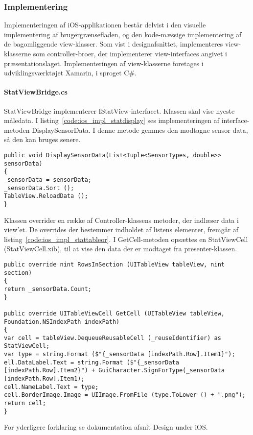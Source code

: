 \subsubsection{Implementering}
Implementeringen af iOS-applikationen består delvist i den visuelle implementering af brugergrænsefladen, og den kode-mæssige implementering af de bagomliggende view-klasser. Som vist i designafsnittet, implementeres view-klasserne som controller-broer, der implementerer view-interfaces angivet i præsentationslaget. Implementeringen af view-klasserne foretages i udviklingsværktøjet Xamarin, i sproget C\#. 

\paragraph{StatViewBridge.cs}
StatViewBridge implementerer IStatView-interfacet. Klassen skal vise nyeste måledata. I listing~\ref{code:ios_impl_statdisplay} ses implementeringen af interface-metoden DisplaySensorData. I denne metode gemmes den modtagne sensor data, så den kan bruges senere.

\begin{lstlisting}[caption={DisplaySensorData(...)},label={code:ios_impl_statdisplay}]
public void DisplaySensorData(List<Tuple<SensorTypes, double>> sensorData)
{
_sensorData = sensorData;
_sensorData.Sort ();
TableView.ReloadData ();
}
\end{lstlisting}

Klassen overrider en række af Controller-klassens metoder, der indlæser data i view'et. De overrides der bestemmer indholdet af listens elementer, fremgår af listing~\ref{code:ios_impl_stattableor}. I GetCell-metoden opsættes en StatViewCell (StatViewCell.xib), til at vise den data der er modtaget fra presenter-klassen.

\begin{lstlisting}[caption={Overrides af UITableViewController-metoder i StatViewBridge},label={code:ios_impl_stattableor}]
public override nint RowsInSection (UITableView tableView, nint section)
{
return _sensorData.Count;
}

public override UITableViewCell GetCell (UITableView tableView, Foundation.NSIndexPath indexPath)
{	
var cell = tableView.DequeueReusableCell (_reuseIdentifier) as StatViewCell;
var type = string.Format ($"{_sensorData [indexPath.Row].Item1}");
ell.DataLabel.Text = string.Format ($"{_sensorData [indexPath.Row].Item2}") + GuiCharacter.SignForType(_sensorData [indexPath.Row].Item1);
cell.NameLabel.Text = type;
cell.BorderImage.Image = UIImage.FromFile (type.ToLower () + ".png");
return cell;
}
\end{lstlisting}

For yderligere forklaring se dokumentation afsnit Design under iOS.